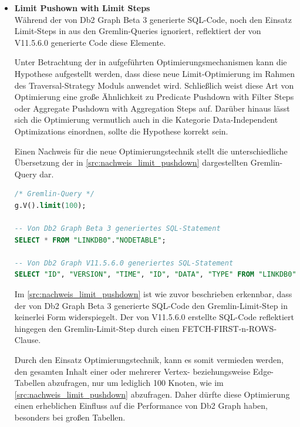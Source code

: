 \begin{itemize}
    \item \textbf{Limit Pushown with Limit Steps}\\
    Während der von Db2 Graph Beta 3 generierte SQL-Code, noch den Einsatz Limit-Steps in aus den Gremlin-Queries ignoriert, reflektiert der von V11.5.6.0 generierte Code diese Elemente. 

    Unter Betrachtung der in  aufgeführten Optimierungsmechanismen kann die Hypothese aufgestellt werden, dass diese neue Limit-Optimierung im Rahmen des Traversal-Strategy Moduls anwendet wird. Schließlich weist diese Art von Optimierung eine große Ähnlichkeit zu Predicate Pushdown with Filter Steps oder Aggregate Pushdown with Aggregation Steps auf. Darüber hinaus lässt sich die Optimierung vermutlich auch in die Kategorie Data-Independent Optimizations einordnen, sollte die Hypothese korrekt sein.

    Einen Nachweis für die neue Optimierungstechnik stellt die unterschiedliche Übersetzung der in \autoref{src:nachweis_limit_pushdown} dargestellten Gremlin-Query dar.

\begin{lstlisting}[label=src:nachweis_limit_pushdown,caption={Nachweis Limit Pushdown Optimierung},language=SQL]
/* Gremlin-Query */
g.V().limit(100);

-- Von Db2 Graph Beta 3 generiertes SQL-Statement
SELECT * FROM "LINKDB0"."NODETABLE";

-- Von Db2 Graph V11.5.6.0 generiertes SQL-Statement
SELECT "ID", "VERSION", "TIME", "ID", "DATA", "TYPE" FROM "LINKDB0"."NODETABLE" FETCH FIRST 100 ROWS;
\end{lstlisting}

    Im \autoref{src:nachweis_limit_pushdown} ist wie zuvor beschrieben erkennbar, dass der von Db2 Graph Beta 3 generierte SQL-Code den Gremlin-Limit-Step in keinerlei  Form widerspiegelt. Der von V11.5.6.0 erstellte SQL-Code reflektiert hingegen den Gremlin-Limit-Step durch einen FETCH-FIRST-n-ROWS-Clause.

    Durch den Einsatz Optimierungstechnik, kann es somit vermieden werden, den gesamten Inhalt einer oder mehrerer Vertex- beziehungsweise Edge-Tabellen abzufragen, nur um lediglich 100 Knoten, wie im \autoref{src:nachweis_limit_pushdown} abzufragen. Daher dürfte diese Optimierung einen erheblichen Einfluss auf die Performance von Db2 Graph haben, besonders bei großen Tabellen.


\end{itemize}
